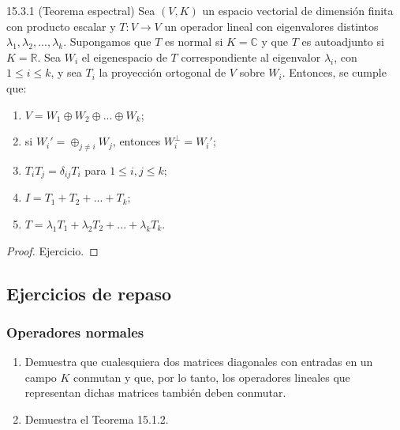 \documentclass[12pt,libertine]{book}
\begin{document}
\begin{Teo} {15.3.1 (Teorema espectral)}
Sea $(V,K)$ un espacio vectorial de dimensión finita con producto escalar y $T:V\to V$ un operador lineal con eigenvalores distintos $\lambda_1,\lambda_2,...,\lambda_k$. Supongamos que $T$ es normal si $K=\mathbb{C}$ y que $T$ es autoadjunto si $K=\mathbb{R}$. Sea $W_i$ el eigenespacio de $T$ correspondiente al eigenvalor $\lambda_i$, con $1\leq i\leq k$, y sea $T_i$ la proyección ortogonal de $V$ sobre $W_i$. Entonces, se cumple que:
\begin{enumerate}[label=\alph*)]
    \item $V = W_1 \oplus W_2 \oplus ... \oplus W_k$;
    \item si $W_i'=\oplus_{j\neq i}W_j$, entonces $W_i^\perp=W_i'$;
    \item $T_i T_j = \delta_{ij}T_i$ para $1\leq i,j\leq k$;
    \item $I = T_1+T_2+...+T_k$;
    \item $T = \lambda_1 T_1 + \lambda_2 T_2 + ... + \lambda_k T_k$.
\end{enumerate}

\begin{proof}
    
    Ejercicio.

\end{proof}

\end{Teo}

\subsection*{Ejercicios de repaso}

\subsubsection*{Operadores normales}
\begin{enumerate}
    \item Demuestra que cualesquiera dos matrices diagonales con entradas en un campo $K$ conmutan y que, por lo tanto, los operadores lineales que representan dichas matrices también deben conmutar.
    \item Demuestra el Teorema 15.1.2.
\end{enumerate}
\end{document}
